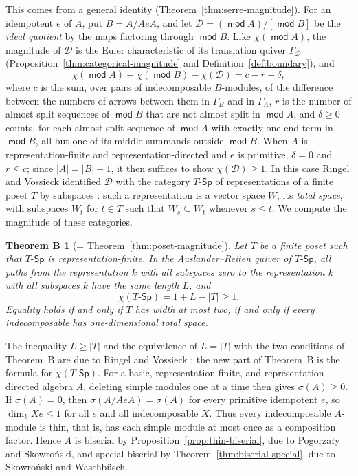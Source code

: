\documentclass[a4paper,reqno,10pt]{amsart}
\newtheorem*{theoremB}{Theorem B}
\theoremstyle{definition}
\numberwithin{equation}{section}
\DeclareMathOperator{\moduleCategory}{\mathsf{mod}}
\renewcommand{\mod}{\moduleCategory}
\newcommand{\cD}{\mathcal D}
\newcommand{\TSp}{T\text{-}\mathsf{Sp}}
\begin{document}
This comes from a general identity (Theorem~\ref{thm:serre-magnitude}).
For an idempotent \(e\) of \(A\), put \(B=A/AeA\), and let
\(\cD=(\mod A)/[\mod B]\) be the \emph{ideal quotient} by the maps
factoring through \(\mod B\). Like \(\chi(\mod A)\), the magnitude of \(\cD\) is
the Euler characteristic of its translation quiver \(\Gamma_{\cD}\)
(Proposition~\ref{thm:categorical-magnitude} and
Definition~\ref{def:boundary}), and
\[
 \chi(\mod A)-\chi(\mod B)-\chi(\cD)=c-r-\delta,
\]
where \(c\) is the sum, over pairs of indecomposable \(B\)-modules, of
the difference between the numbers of arrows between them in \(\Gamma_B\)
and in \(\Gamma_A\), \(r\) is the number of almost split sequences of
\(\mod B\) that are not almost split in \(\mod A\), and \(\delta\geq0\)
counts, for each almost split sequence of \(\mod A\) with exactly one end
term in \(\mod B\), all but one of its middle summands outside
\(\mod B\). When \(A\) is representation-finite
and representation-directed and \(e\) is primitive, \(\delta=0\) and
\(r\leq c\); since \(|A|=|B|+1\), it then suffices to show
\(\chi(\cD)\geq1\). In this case
Ringel and Vossieck identified \(\cD\) with the category \(\TSp\) of
representations of a finite poset \(T\) by subspaces
\cite[Section~10, Theorem, p.~243]{RV}: such a representation is a vector
space \(W\), its \emph{total space}, with subspaces \(W_t\) for \(t\in T\)
such that \(W_s\subseteq W_t\) whenever \(s\leq t\). We compute the magnitude of these
categories.

\begin{theoremB}[= Theorem~\ref{thm:poset-magnitude}]
Let \(T\) be a finite poset such that \(\TSp\) is representation-finite.
In the Auslander--Reiten quiver of \(\TSp\), all paths from the
representation \(k\) with all subspaces zero to the representation \(k\)
with all subspaces \(k\) have the same length \(L\), and
\[
 \chi(\TSp)=1+L-|T|\geq1.
\]
Equality holds if and only if \(T\) has width at most two, if and only if
every indecomposable has one-dimensional total space.
\end{theoremB}

The inequality \(L\geq|T|\) and the equivalence of \(L=|T|\) with the two
conditions of Theorem~B are due to Ringel and Vossieck
\cite[Section~8, p.~237]{RV}; the new part of Theorem~B is the formula for
\(\chi(\TSp)\). For a basic, representation-finite, and
representation-directed algebra \(A\),
deleting simple modules one at a time then gives \(\sigma(A)\geq0\). If
\(\sigma(A)=0\), then \(\sigma(A/AeA)=\sigma(A)\) for every primitive
idempotent \(e\), so \(\dim_k Xe\leq1\) for all \(e\) and all
indecomposable \(X\). Thus every indecomposable \(A\)-module
is thin, that is, has each simple module at most once as a composition
factor. Hence \(A\) is biserial by
Proposition~\ref{prop:thin-biserial}, due to Pogorza{\l}y and
Skowro\'nski, and special biserial by Theorem~\ref{thm:biserial-special},
due to Skowro\'nski and Waschb\"usch.
\end{document}
